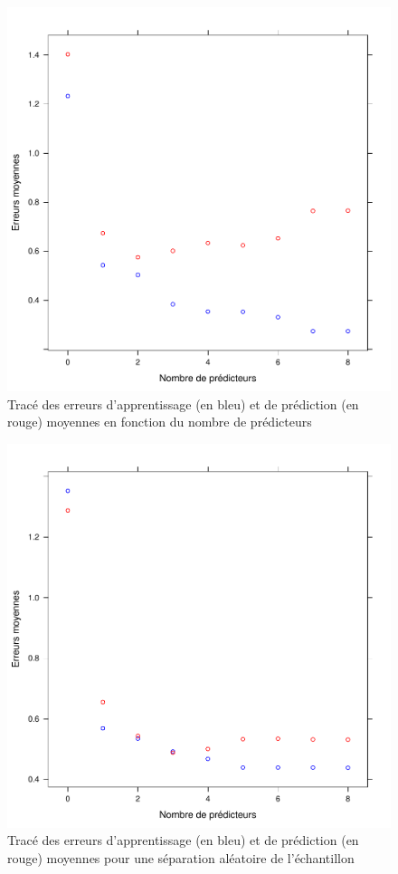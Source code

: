\documentclass[a4paper, 12pt]{article}
\begin{document}
\begin{figure}
\begin{center}
\includegraphics[scale=1]{erreurs_moy.pdf}
\caption{Tracé des erreurs d'apprentissage (en bleu) et de prédiction (en rouge) moyennes en fonction du nombre de prédicteurs}
\end{center}
\end{figure}

\begin{figure}
\begin{center}
\includegraphics[scale=1]{erreurs_moy_autre.pdf}
\caption{Tracé des erreurs d'apprentissage (en bleu) et de prédiction (en rouge) moyennes pour une séparation aléatoire de l'échantillon}
\end{center}
\end{figure}
\end{document}
